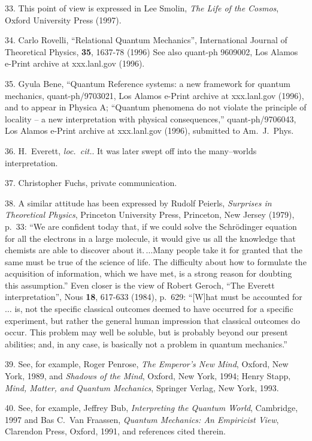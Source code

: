 33.  This point of view is expressed in Lee Smolin, {\it The Life of
the Cosmos\/}, Oxford University Press (1997).

34. Carlo Rovelli, ``Relational
Quantum Mechanics'', International Journal of Theoretical Physics,
{\bf 35}, 1637-78 (1996)   See also quant-ph 9609002, Los
Alamos e-Print archive at xxx.lanl.gov (1996).

35. Gyula Bene, ``Quantum Reference systems: a new framework for
quantum mechanics, quant-ph/9703021, Los Alamos e-Print archive at
xxx.lanl.gov (1996), and to appear in Physica A; ``Quantum phenomena
do not violate the principle of locality -- a new interpretation with
physical consequences,'' quant-ph/9706043, Los Alamos e-Print archive
at xxx.lanl.gov (1996), submitted to Am.~J.~Phys.

36.  H.~Everett, {\it loc.~cit.\/}.  It was later swept
off into the many--worlds interpretation.

37. Christopher Fuchs, private communication.

38.  A similar attitude has been
expressed by Rudolf Peierls, {\it Surprises in Theoretical
Physics\/}, Princeton University Press, Princeton, New Jersey (1979),
p.~33: ``We are confident today that, if we could solve the
Schr\"odinger equation for all the electrons in a large molecule, it
would give us all the knowledge that chemists are able to discover
about it.$\,\ldots$Many people take it for granted that the same must be
true of the science of life.  The difficulty about how to formulate
the acquisition of information, which we have met, is a strong reason
for doubting this assumption.'' Even closer is the view of Robert
Geroch, ``The Everett interpretation'', Nous {\bf
18}, 617-633 (1984), p.~629: ``[W]hat must be accounted for$\ldots$
is, not the specific classical outcomes deemed to have occurred for a
specific experiment, but rather the general human impression that
classical outcomes do occur.  This problem may well be soluble, but is
probably beyond our present abilities; and, in any case, is basically
not a problem in quantum mechanics.''

39.  See, for example, Roger Penrose, {\it The Emperor's New Mind\/},
Oxford, New York, 1989, and {\it Shadows of the Mind\/}, Oxford, New
York, 1994; Henry Stapp, {\it Mind, Matter, and Quantum Mechanics},
Springer Verlag, New York, 1993.

40.  See, for example, Jeffrey Bub, {\it Interpreting the Quantum
World\/}, Cambridge, 1997 and Bas C.~Van Fraassen, {\it Quantum
Mechanics: An Empiricist View\/}, Clarendon Press, Oxford, 1991, and
references cited therein.

